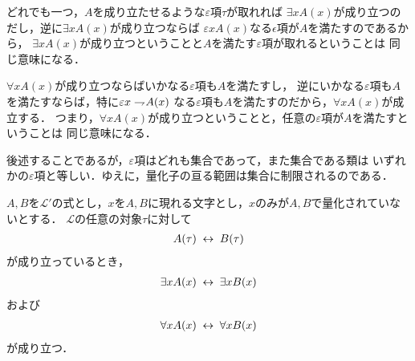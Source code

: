 	どれでも一つ，$A$を成り立たせるような$\varepsilon$項$\tau$が取れれば
	$\exists x A(x)$が成り立つのだし，逆に$\exists x A(x)$が成り立つならば
	$\varepsilon x A(x)$なる$\epsilon$項が$A$を満たすのであるから，
	$\exists x A(x)$が成り立つということと$A$を満たす$\varepsilon$項が取れるということは
	同じ意味になる．
	
	$\forall x A(x)$が成り立つならばいかなる$\varepsilon$項も$A$を満たすし，
	逆にいかなる$\varepsilon$項も$A$を満たすならば，特に$\varepsilon x \rightharpoondown\hspace{-0.25em} A(x)$
	なる$\varepsilon$項も$A$を満たすのだから，$\forall x A(x)$が成立する．
	つまり，$\forall x A(x)$が成り立つということと，任意の$\varepsilon$項が$A$を満たすということは
	同じ意味になる．
	
	後述することであるが，$\varepsilon$項はどれも集合であって，また集合である類は
	いずれかの$\varepsilon$項と等しい．ゆえに，量化子の亘る範囲は集合に制限されるのである．
	
	\begin{screen}
		\begin{logicalthm}[量化記号の性質(イ)]\label{logicalthm:properties_of_quantifiers}
			$A,B$を$\mathcal{L}'$の式とし，$x$を$A,B$に現れる文字とし，$x$のみが$A,B$で量化されていないとする．
			$\mathcal{L}$の任意の対象$\tau$に対して
			\begin{align}
				A(\tau) \hspace{0.25em}\leftrightarrow\hspace{0.25em} B(\tau)
			\end{align}
			が成り立っているとき，
			\begin{align}
				\exists x A(x) \hspace{0.25em}\leftrightarrow\hspace{0.25em} \exists x B(x)
			\end{align}
			および
			\begin{align}
				\forall x A(x) \hspace{0.25em}\leftrightarrow\hspace{0.25em} \forall x B(x)
			\end{align}
			が成り立つ．
		\end{logicalthm}
	\end{screen}
	
